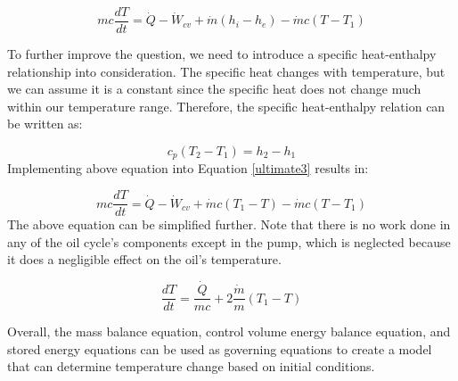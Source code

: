 	\begin{equation}
		\label{ultimate3}
		m c \frac{dT}{dt} = \dot{Q} -  \dot{W}_{cv} + \dot{m} (h_i - h_e) - \dot{m} c (T - T_1)
	\end{equation}

	To further improve the question, we need to introduce a specific heat-enthalpy relationship into consideration. The specific heat changes with temperature, but we can assume it is a constant since the specific heat does not change much within our temperature range. Therefore, the specific heat-enthalpy relation can be written as:
 
	\begin{equation}
		\label{specific}
		c_p (T_2 -T_1) = h_2 - h_1
	\end{equation}
	\noindent
	Implementing above equation into Equation \ref{ultimate3} results in:
 
	\begin{equation}
		\label{ultimate4}
		m c \frac{dT}{dt} = \dot{Q} -  \dot{W}_{cv} + \dot{m} c (T_1 - T) - \dot{m} c (T - T_1)
	\end{equation}
	\noindent
	The above equation can be simplified further. Note that there is no work done in any of the oil cycle's components except in the pump, which is neglected because it does a negligible effect on the oil's temperature.
 
	\begin{equation}
		\label{ultimate5}
		\frac{dT}{dt} = \frac{\dot{Q}}{mc}+ 2\frac{\dot{m}}{m}(T_1 - T) 
	\end{equation}
	
	Overall, the mass balance equation, control volume energy balance equation, and stored energy equations can be used as governing equations to create a model that can determine temperature change based on initial conditions.
